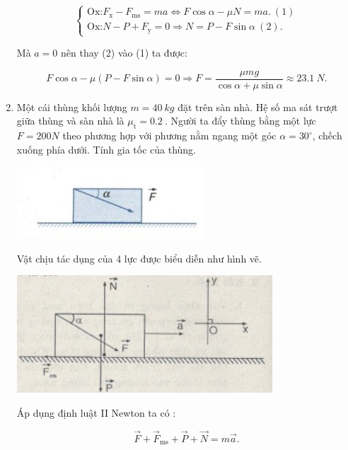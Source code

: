 \begin{enumerate}[label=\bfseries Bài \arabic*:,leftmargin=1.5cm]
{		$$\begin{cases}
			\text{Ox:} F_\text{x} - F_\text{ms} = ma \Leftrightarrow F\cos \alpha - \mu N = ma.\ (1) \\
			\text{Ox:}  N - P + F_\text{y}= 0 \Rightarrow N =P - F\sin \alpha\ (2).
			
		\end{cases}$$
		
		Mà $a = 0$ nên thay (2) vào (1) ta được:
		
		$$F\cos \alpha - \mu(P - F\sin \alpha) = 0 \Rightarrow F = \dfrac{\mu mg}{\cos \alpha + \mu \sin \alpha} \approx \SI{23,1}{N}.$$
		
		
	}

	\item {}
	
	
	{
		Một cái thùng khối lượng $m = \SI{40}{kg}$ đặt trên sàn nhà. Hệ số ma sát trượt giữa thùng và sàn nhà là $\mu_\text{t} = \SI{0,2}{}$. Người ta đẩy thùng bằng một lực $F =200N$ theo phương hợp với phương nằm ngang một góc $\alpha = 30^\circ$, chếch xuống phía dưới. Tính gia tốc của thùng. 
		
		\begin{center}
			\includegraphics[scale=1]{../figs/VN10-2022-PH-TP021-17.jpg}
		\end{center}
	}
	
	\hideall
	{
		Vật chịu tác dụng của 4 lực được biểu diễn như hình vẽ.
		
		\begin{center}
			\includegraphics[scale=1]{../figs/VN10-2022-PH-TP021-18.jpg}
		\end{center}
		
		Áp dụng định luật II Newton ta có :
		
		$$\vec F + \vec F_\text{ms} + \vec P + \vec N = m\vec a.$$
		
}
\end{enumerate}
